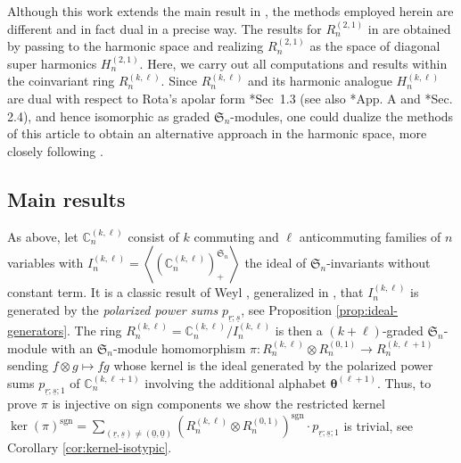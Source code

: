 \documentclass[11pt, reqno]{amsart}
\theoremstyle{definition}
\theoremstyle{remark}
\numberwithin{equation}{section}
\newcommand{\0}{\emptyset}
\newcommand{\C}{\mathbb{C}}
\renewcommand{\S}{\mathfrak{S}}
\renewcommand{\r}{\underline{r}}
\newcommand{\s}{\underline{s}}
\DeclareMathOperator{\sgn}{sgn}
\begin{document}
Although this work extends the main result in \cite{GLM}, the methods employed herein are different 
and in fact dual in a precise way. The results for $R_n^{(2,1)}$ in \cite{GLM} are obtained 
by passing to the harmonic space and realizing $R_n^{(2,1)}$ as 
the space of diagonal super harmonics $H_n^{(2,1)}$. 
Here, we carry out all computations and results within the coinvariant ring $R_n^{(k,\ell)}$. 
Since $R_n^{(k,\ell)}$ and its harmonic analogue $H_n^{(k,\ell)}$ are dual with respect to 
Rota's apolar form \cite{Haiman1994}*{Sec~1.3} (see also \cite{JiangLentfer}*{App. A} 
and \cite{SwansonWallach1}*{Sec. 2.4}), and hence isomorphic as graded $\S_n$-modules, 
one could dualize the methods of this article to obtain an alternative approach in the harmonic space, 
more closely following \cite{GLM}. 

\subsection{Main results}
As above, let $\C_n^{(k,\ell)}$ consist of $k$ commuting and $\ell$ anticommuting families of $n$ 
variables with $I_n^{(k,\ell)} = \left\langle \left(\C_n^{(k,\ell)}\right)^{\S_n}_+\right\rangle$ 
the ideal of $\S_n$-invariants without constant term. 
It is a classic result of Weyl \cite{Weyl}, generalized in \cites{OrellanaZabrocki, JiangLentfer}, 
that $I_n^{(k,\ell)}$ is generated by the \emph{polarized power sums} $p_{\r;\s}$, see Proposition \ref{prop:ideal-generators}.
The ring $R_n^{(k,\ell)} = \C_n^{(k,\ell)} / I_n^{(k,\ell)}$ is then a $(k+\ell)$-graded 
$\S_n$-module with an $\S_n$-module homomorphism $\pi: R_n^{(k,\ell)} \otimes R_n^{(0,1)} \to R_n^{(k,\ell+1)}$ 
sending $f \otimes g \mapsto fg$ whose kernel is the ideal generated by the polarized power sums 
$p_{\r;\s;1}$ of $\C_n^{(k,\ell+1)}$ involving the additional alphabet $\bm{\theta}^{(\ell+1)}$. 
Thus, to prove $\pi$ is injective on sign components we show the restricted kernel 
$\ker(\pi)^{\sgn} = \sum_{(\r,\s) \neq (\underline{0},\underline{0})} \left(R_n^{(k,\ell)} 
\otimes R_n^{(0,1)}\right)^{\sgn} \cdot p_{\r;\s;1}$ is trivial, see Corollary \ref{cor:kernel-isotypic}.
\end{document}
